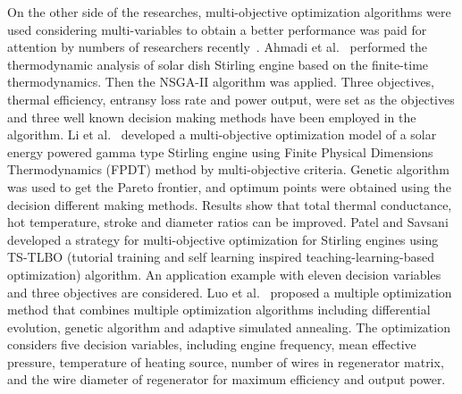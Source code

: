 On the other side of the researches, multi-objective optimization algorithms were used considering multi-variables to obtain a better performance was paid for attention by numbers of researchers recently~\cite{Ahmadi2016,Li2016b,Patel2016,Luo2016}.
Ahmadi et al.~\cite{Ahmadi2016} performed the thermodynamic analysis of solar dish Stirling engine based on the finite-time thermodynamics. Then the NSGA-II algorithm was applied. Three objectives, thermal efficiency, entransy loss rate and power output, were set as the objectives and three well known decision making methods have been employed in the algorithm.
Li et al.~\cite{Li2016b} developed a multi-objective optimization model of a solar energy powered gamma type Stirling engine using Finite Physical Dimensions Thermodynamics (FPDT) method by multi-objective criteria. Genetic algorithm was used to get the Pareto frontier, and optimum points were obtained using the decision different making methods. Results show that total thermal conductance, hot temperature, stroke and diameter ratios can be improved.
Patel and Savsani~\cite{Patel2016} developed a strategy for multi-objective optimization for Stirling engines using TS-TLBO (tutorial training and self learning inspired teaching-learning-based optimization) algorithm. An application example with eleven decision variables and three objectives are considered.
Luo et al.~\cite{Luo2016} proposed a multiple optimization method that combines multiple optimization algorithms including differential evolution, genetic algorithm and adaptive simulated annealing. The optimization considers five decision variables, including engine frequency, mean effective pressure, temperature of heating source, number of wires in regenerator matrix, and the wire diameter of regenerator for maximum efficiency and output power.



